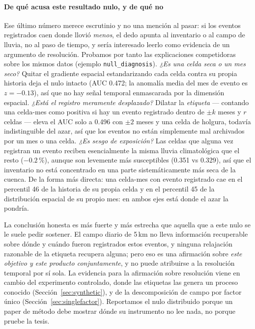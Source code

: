 \documentclass[authoryear,preprint,review,12pt]{elsarticle}
\begin{document}
\paragraph{De qué acusa este resultado nulo, y de qué no}
Ese último número merece escrutinio y no una mención al pasar: si los eventos
registrados caen donde llovió \emph{menos}, el dedo apunta al inventario o al campo
de lluvia, no al paso de tiempo, y sería interesado leerlo como evidencia de un
argumento de resolución. Probamos por tanto las explicaciones competidoras sobre
los mismos datos (ejemplo \texttt{null\_diagnosis}). \emph{¿Es una celda seca o un
mes seco?} Quitar el gradiente espacial estandarizando cada celda contra su propia
historia deja el nulo intacto (AUC 0.472; la anomalía media del mes de evento es
$z=-0.13$), así que no hay señal temporal enmascarada por la dimensión espacial.
\emph{¿Está el registro meramente desplazado?} Dilatar la \emph{etiqueta} ---
contando una celda-mes como positiva si hay un evento registrado dentro de $\pm k$
meses y $r$ celdas --- eleva el AUC solo a 0.496 con $\pm2$ meses y una celda de
holgura, todavía indistinguible del azar, así que los eventos no están simplemente
mal archivados por un mes o una celda. \emph{¿Es sesgo de exposición?} Las celdas
que alguna vez registran un evento reciben esencialmente la misma lluvia
climatológica que el resto ($-0.2$\,\%), aunque son levemente más susceptibles
(0.351 vs 0.329), así que el inventario no está concentrado en una parte
sistemáticamente más seca de la cuenca. De la forma más directa: una celda-mes con
evento registrado cae en el percentil 46 de la historia de su propia celda y en el
percentil 45 de la distribución espacial de su propio mes: en ambos ejes está donde
el azar la pondría.

La conclusión honesta es más fuerte y más estrecha que aquella que a este nulo se
le suele pedir sostener. El campo diario de 5\,km no lleva información recuperable
sobre dónde y cuándo fueron registrados estos eventos, y ninguna relajación
razonable de la etiqueta recupera alguna; pero eso es una afirmación sobre
\emph{este objetivo y este producto conjuntamente}, y no puede atribuirse a la
resolución temporal por sí sola. La evidencia para la afirmación sobre resolución
viene en cambio del experimento controlado, donde las etiquetas las genera un
proceso conocido (Sección~\ref{sec:synthetic}), y de la descomposición de campo por
factor único (Sección~\ref{sec:singlefactor}). Reportamos el nulo distribuido
porque un paper de método debe mostrar dónde su instrumento no lee nada, no porque
pruebe la tesis.
\end{document}
